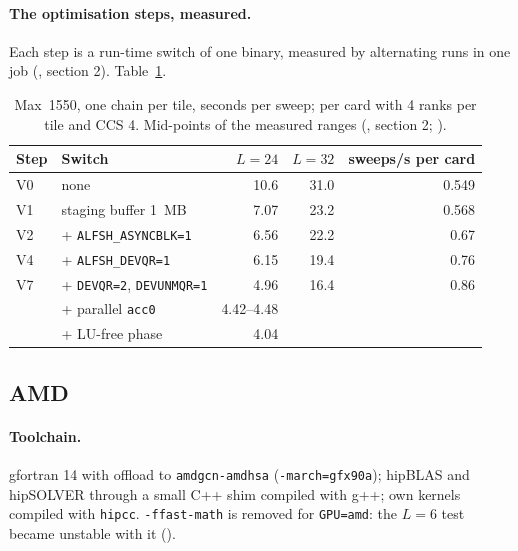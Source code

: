 \paragraph{The optimisation steps, measured.} Each step is a run-time switch of one binary, measured by alternating runs in one job (, section 2). Table~\ref{tab:intelsteps}.

\begin{table}[h]
\centering\small
\caption{Max~1550, one chain per tile, seconds per sweep; per card with 4 ranks per tile and CCS 4. Mid-points of the measured ranges (, section 2; ).}
\label{tab:intelsteps}
\begin{tabular}{@{}llrrr@{}}
\toprule
Step & Switch & $L=24$ & $L=32$ & sweeps/s per card \\
\midrule
V0 & none & 10.6 & 31.0 & 0.549 \\ %
V1 & staging buffer 1~MB & 7.07 & 23.2 & 0.568 \\
V2 & + \texttt{ALFSH\_ASYNCBLK=1} & 6.56 & 22.2 & 0.67 \\
V4 & + \texttt{ALFSH\_DEVQR=1} & 6.15 & 19.4 & 0.76 \\
V7 & + \texttt{DEVQR=2}, \texttt{DEVUNMQR=1} & 4.96 & 16.4 & 0.86 \\
& + parallel \texttt{acc0} & 4.42--4.48 & & \\ %
& + LU-free phase & 4.04 & & \\ %
\bottomrule
\end{tabular}
\end{table}

\subsection{AMD}
\label{sec:amd}

\paragraph{Toolchain.} gfortran 14 with offload to \texttt{amdgcn-amdhsa} (\texttt{-march=gfx90a}); hipBLAS and hipSOLVER through a small C++ shim compiled with g++; own kernels compiled with \texttt{hipcc}. \texttt{-ffast-math} is removed for \texttt{GPU=amd}: the $L=6$ test became unstable with it ().

